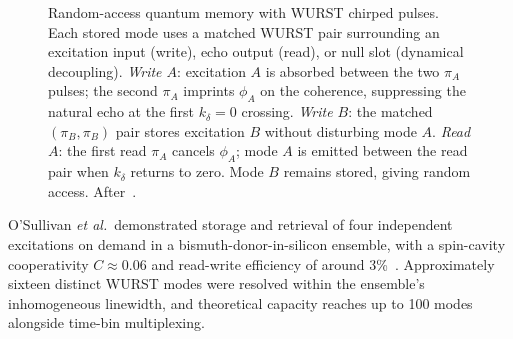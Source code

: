 \documentclass[technote]{IEEEtran}
\begin{document}
\begin{figure}[t]
{%
}%
\caption{Random-access quantum memory with WURST chirped pulses. Each stored mode uses a matched WURST pair surrounding an excitation input (write), echo output (read), or null slot (dynamical decoupling). \emph{Write $A$}: excitation $A$ is absorbed between the two $\pi_A$ pulses; the second $\pi_A$ imprints $\phi_A$ on the coherence, suppressing the natural echo at the first $k_\delta{=}0$ crossing. \emph{Write $B$}: the matched $(\pi_B,\pi_B)$ pair stores excitation $B$ without disturbing mode $A$. \emph{Read $A$}: the first read $\pi_A$ cancels $\phi_A$; mode $A$ is emitted between the read pair when $k_\delta$ returns to zero. Mode $B$ remains stored, giving random access. After~\cite{osullivan2022}.}
\label{fig:wurst}
\vspace{-1.5ex}
\end{figure}

O'Sullivan \textit{et al.}\ demonstrated storage and retrieval of four independent excitations on demand in a bismuth-donor-in-silicon ensemble, with a spin-cavity cooperativity $C \approx 0.06$ and read-write efficiency of around 3\%~\cite{osullivan2022}. Approximately sixteen distinct WURST modes were resolved within the ensemble's inhomogeneous linewidth, and theoretical capacity reaches up to 100 modes alongside time-bin multiplexing.
\end{document}
